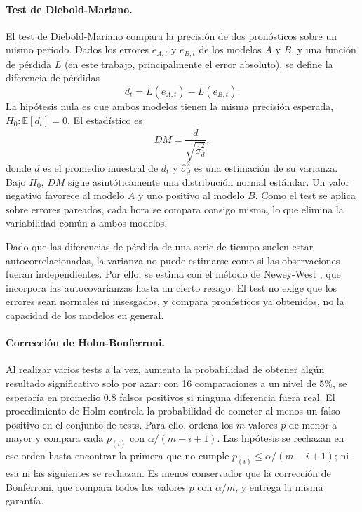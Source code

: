 \paragraph{Test de Diebold-Mariano.} El test de Diebold-Mariano \cite{DieboldMariano1995} compara la precisión de dos pronósticos sobre un mismo período. Dados los errores $e_{A,t}$ y $e_{B,t}$ de los modelos $A$ y $B$, y una función de pérdida $L$ (en este trabajo, principalmente el error absoluto), se define la diferencia de pérdidas
\begin{equation}
    d_t = L(e_{A,t}) - L(e_{B,t}).
    \label{eq:dm_diferencia}
\end{equation}
La hipótesis nula es que ambos modelos tienen la misma precisión esperada, $H_0: \mathbb{E}[d_t] = 0$. El estadístico es
\begin{equation}
    DM = \frac{\bar{d}}{\sqrt{\hat{\sigma}^2_{\bar{d}}}},
    \label{eq:dm_estadistico}
\end{equation}
donde $\bar{d}$ es el promedio muestral de $d_t$ y $\hat{\sigma}^2_{\bar{d}}$ es una estimación de su varianza. Bajo $H_0$, $DM$ sigue asintóticamente una distribución normal estándar. Un valor negativo favorece al modelo $A$ y uno positivo al modelo $B$. Como el test se aplica sobre errores pareados, cada hora se compara consigo misma, lo que elimina la variabilidad común a ambos modelos.

Dado que las diferencias de pérdida de una serie de tiempo suelen estar autocorrelacionadas, la varianza no puede estimarse como si las observaciones fueran independientes. Por ello, se estima con el método de Newey-West \cite{NeweyWest1987}, que incorpora las autocovarianzas hasta un cierto rezago. El test no exige que los errores sean normales ni insesgados, y compara pronósticos ya obtenidos, no la capacidad de los modelos en general.

\paragraph{Corrección de Holm-Bonferroni.} Al realizar varios tests a la vez, aumenta la probabilidad de obtener algún resultado significativo solo por azar: con 16 comparaciones a un nivel de 5\%, se esperaría en promedio 0.8 falsos positivos si ninguna diferencia fuera real. El procedimiento de Holm \cite{Holm1979} controla la probabilidad de cometer al menos un falso positivo en el conjunto de tests. Para ello, ordena los $m$ valores $p$ de menor a mayor y compara cada $p_{(i)}$ con $\alpha/(m-i+1)$. Las hipótesis se rechazan en ese orden hasta encontrar la primera que no cumple $p_{(i)} \leq \alpha/(m-i+1)$; ni esa ni las siguientes se rechazan. Es menos conservador que la corrección de Bonferroni, que compara todos los valores $p$ con $\alpha/m$, y entrega la misma garantía.

